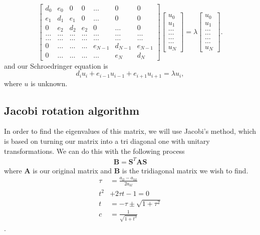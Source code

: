 \documentclass[12pt]{article}
\begin{document}
\begin{equation}
    \begin{bmatrix}
        d_0    & e_0   & 0     & 0      & \dots & 0     & 0 \\
        e_1    & d_1   & e_1   & 0      & \dots & 0     &0 \\
        0      & e_2   & d_2   & e_2    & 0     & \dots & 0\\
        \dots  & \dots & \dots & \dots  & \dots & \dots & \dots\\
        \dots  & \dots & \dots & \dots  & \dots & \dots & \dots\\
        0      & \dots & \dots & \dots  & e_{N-1}     &d_{N-1} & e_{N-1}\\
        0      & \dots & \dots & \dots  & \dots & e_{N} & d_{N}
    \end{bmatrix}
    \begin{bmatrix} 
        u_{0} \\ u_{1} \\ \dots\\ \dots\\ \dots\\ \dots\\ u_{N} 
    \end{bmatrix}
    =\lambda \begin{bmatrix} 
        u_{0} \\ u_{1} \\ \dots\\ \dots\\ \dots\\ \dots\\ u_{N}
    \end{bmatrix}.  
    \label{eq:sematrix}
\end{equation}
and our Schroedringer equation is
\begin{equation*}
d_iu_i+e_{i-1}u_{i-1}+e_{i+1}u_{i+1}  = \lambda u_i,
\end{equation*}
where $u$ is unknown. 
\subsection*{Jacobi rotation algorithm}
In order to find the eigenvalues of this matrix, we will use Jacobi's method, which is based on turning our matrix into a tri diagonal one with unitary transformations. We can do this with the following process
\begin{align*}
    \textbf{B} = \textbf{S}^T\textbf{AS}
\end{align*}
where $\textbf{A}$ is our original matrix and $\textbf{B}$ is the tridiagonal matrix we wish to find.
\begin{align*}
    \tau &= \frac{a_{ll}-a_{kk}}{2a_{kl}}\\
    t^2 &+2\tau t -1 = 0\\
    t &= -\tau\pm \sqrt{1+\tau^2}\\
    c &= \frac{1}{\sqrt{1+t^2}}
\end{align*}.
\end{document}
